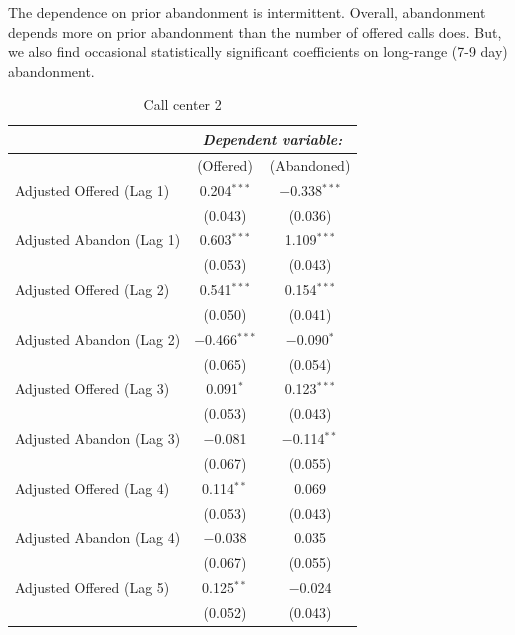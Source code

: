\documentclass[manuscript,screen,authorversion]{acmart}
\begin{document}
The dependence on prior abandonment is intermittent. Overall, abandonment depends more on prior abandonment than the number of offered calls does. But, we also find occasional statistically significant coefficients on long-range (7-9 day) abandonment. 


\begin{table}[htbp]
\centering
\caption{Call center 2}
\label{table-callcenter-1}
\small
\renewcommand{\arraystretch}{0.9}
\setlength{\tabcolsep}{4pt}

\begin{tabularx}{0.92\linewidth}{@{\extracolsep{\fill}}>{\raggedright\arraybackslash}Xcc}
\hline\hline
 & \multicolumn{2}{c}{\textit{Dependent variable:}} \\
\cline{2-3}
 & (Offered) & (Abandoned) \\
\hline


Adjusted Offered (Lag 1)  & 0.204$^{***}$ & $-$0.338$^{***}$ \\
 & (0.043) & (0.036) \\

Adjusted Abandon (Lag 1)  & 0.603$^{***}$ & 1.109$^{***}$ \\
 & (0.053) & (0.043) \\

Adjusted Offered (Lag 2)  & 0.541$^{***}$ & 0.154$^{***}$ \\
 & (0.050) & (0.041) \\

Adjusted Abandon (Lag 2)  & $-$0.466$^{***}$ & $-$0.090$^{*}$ \\
 & (0.065) & (0.054) \\

Adjusted Offered (Lag 3)  & 0.091$^{*}$ & 0.123$^{***}$ \\
 & (0.053) & (0.043) \\

Adjusted Abandon (Lag 3)  & $-$0.081 & $-$0.114$^{**}$ \\
 & (0.067) & (0.055) \\

Adjusted Offered (Lag 4)  & 0.114$^{**}$ & 0.069 \\
 & (0.053) & (0.043) \\

Adjusted Abandon (Lag 4)  & $-$0.038 & 0.035 \\
 & (0.067) & (0.055) \\

Adjusted Offered (Lag 5)  & 0.125$^{**}$ & $-$0.024 \\
 & (0.052) & (0.043) \\


\end{tabularx}
\end{table}
\end{document}
